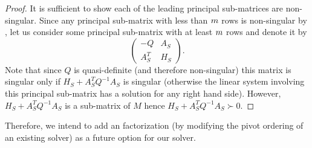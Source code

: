 \documentclass{article}
\begin{document}
\begin{proof}
It is sufficient to show each of the leading principal sub-matrices are non-singular. Since any principal sub-matrix with less than $m$ rows is non-singular by \citet[Theorem 2.1]{vanderbei1995symmetric}, let us consider some principal sub-matrix with at least $m$ rows and denote it by
$$
\left(\begin{matrix}
-Q & A_{S}  \\
A^T_{S} & H_{S}
\end{matrix}\right).
$$
Note that since $Q$ is quasi-definite (and therefore non-singular) this matrix is singular only if $H_{S} + A^T_{S} Q^{-1} A_{S}$ is singular (otherwise the linear system involving this principal sub-matrix has a solution for any right hand side). However, $H_{S} + A^T_{S} Q^{-1} A_{S}$ is a sub-matrix of $M$ hence $H_{S} + A^T_{S} Q^{-1} A_{S} \succ 0$.
\end{proof}

Therefore, we intend to add an \LDL{} factorization (by modifying the pivot ordering of an existing \LDL{} solver) as a future option for our solver.

\fi







%





\end{document}
